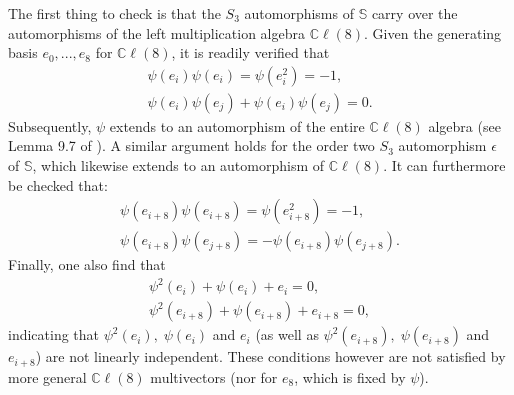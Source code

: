 \documentclass{article}
\newcommand{\bb}[1]{\mathbb{#1}}
\begin{document}
The first thing to check is that the $S_3$ automorphisms of $\bb{S}$ carry over the automorphisms of the left multiplication algebra $\bb{C}\ell(8)$. Given the generating basis $e_0,...,e_8$ for $\bb{C}\ell(8)$, it is readily verified that
\begin{eqnarray}
    \psi(e_i)\psi(e_i)=\psi(e_i^2)=-1,\\
    \psi(e_i)\psi(e_j)+\psi(e_i)\psi(e_j)=0.
\end{eqnarray}
Subsequently, $\psi$ extends to an automorphism of the entire $\bb{C}\ell(8)$ algebra (see Lemma 9.7 of \cite{harvey1990spinors}). A similar argument holds for the order two $S_3$ automorphism $\epsilon$ of $\bb{S}$, which likewise extends to an automorphism of $\bb{C}\ell(8)$.
It can furthermore be checked that:
\begin{eqnarray}
    \psi(e_{i+8})\psi(e_{i+8})=\psi(e_{i+8}^2)=-1,\\
    \psi(e_{i+8})\psi(e_{j+8})=-\psi(e_{i+8})\psi(e_{j+8}).
\end{eqnarray}
Finally, one also find that
\begin{eqnarray}
    \psi^2(e_i)+\psi(e_i)+e_i=0,\\
    \psi^2(e_{i+8})+\psi(e_{i+8})+e_{i+8}=0,
\end{eqnarray}
indicating that $\psi^2(e_i),\; \psi(e_i)$ and $e_i$ (as well as $\psi^2(e_{i+8}),\; \psi(e_{i+8})$ and $e_{i+8}$) are not linearly independent. These conditions however are not satisfied by more general $\bb{C}\ell(8)$ multivectors (nor for $e_8$, which is fixed by $\psi$). 


\end{document}
